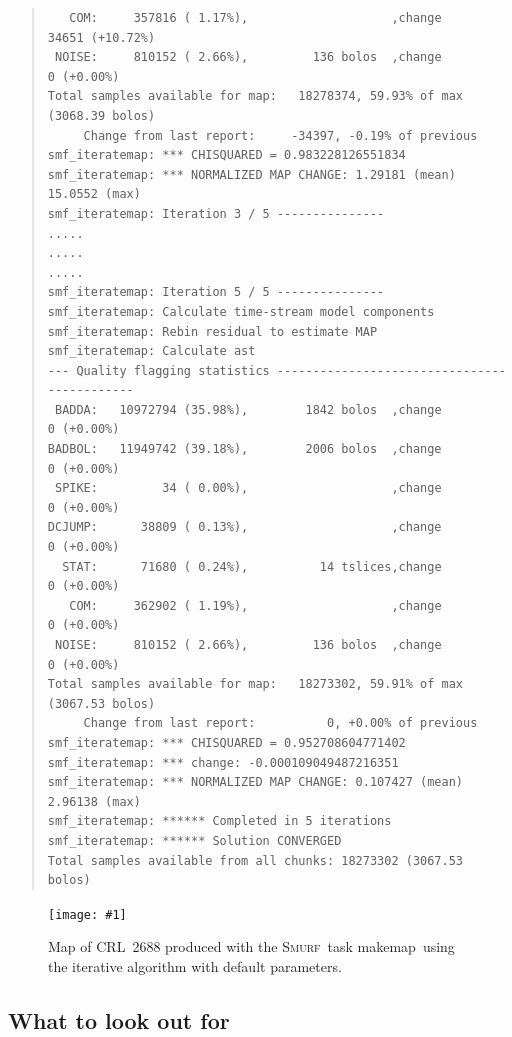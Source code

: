 \documentclass[twoside,11pt]{article}
\newcommand{\htmladdimg}[1]{}
\newcommand{\latex}[1]{#1}
\newcommand{\xref}[3]{#1}
\newcommand{\xlabel}[1]{}
\renewcommand{\_}{\texttt{\symbol{95}}}
\newenvironment{myquote}{
   \color{MidnightBlue}\begin{quote}\begin{small}}{
   \end{small}\end{quote}
}
\newcommand{\smurf}{\xref{\textsc{Smurf}}{sun258}{}}
\newcommand{\task}[1]{\textsf{#1}}
\newcommand{\makemap}{\xref{\task{makemap}}{sun258}{MAKEMAP}}
\newcommand{\myfig}[6]{
  \begin{figure}#2
    \centering\texttt{[image: \#1]}
    \typeout{#1 inserted on page \arabic{page}}
    \caption[#5]{\label{#4}\small #6}
  \end{figure}
}
\newcommand{\myfig}[6]{
    \label{#4} \htmladdimg{#1.png}\\
    \\
    Figure: #6\\
  }
\renewenvironment{myquote}{
      \begin{quote}\begin{small}}{
      \end{small}\end{quote}
   }
\begin{document}
\begin{myquote}
\begin{verbatim}
   COM:     357816 ( 1.17%),                    ,change      34651 (+10.72%)
 NOISE:     810152 ( 2.66%),         136 bolos  ,change          0 (+0.00%)
Total samples available for map:   18278374, 59.93% of max (3068.39 bolos)
     Change from last report:     -34397, -0.19% of previous
smf_iteratemap: *** CHISQUARED = 0.983228126551834
smf_iteratemap: *** NORMALIZED MAP CHANGE: 1.29181 (mean) 15.0552 (max)
smf_iteratemap: Iteration 3 / 5 ---------------
.....
.....
.....
smf_iteratemap: Iteration 5 / 5 ---------------
smf_iteratemap: Calculate time-stream model components
smf_iteratemap: Rebin residual to estimate MAP
smf_iteratemap: Calculate ast
--- Quality flagging statistics --------------------------------------------
 BADDA:   10972794 (35.98%),        1842 bolos  ,change          0 (+0.00%)
BADBOL:   11949742 (39.18%),        2006 bolos  ,change          0 (+0.00%)
 SPIKE:         34 ( 0.00%),                    ,change          0 (+0.00%)
DCJUMP:      38809 ( 0.13%),                    ,change          0 (+0.00%)
  STAT:      71680 ( 0.24%),          14 tslices,change          0 (+0.00%)
   COM:     362902 ( 1.19%),                    ,change          0 (+0.00%)
 NOISE:     810152 ( 2.66%),         136 bolos  ,change          0 (+0.00%)
Total samples available for map:   18273302, 59.91% of max (3067.53 bolos)
     Change from last report:          0, +0.00% of previous
smf_iteratemap: *** CHISQUARED = 0.952708604771402
smf_iteratemap: *** change: -0.000109049487216351
smf_iteratemap: *** NORMALIZED MAP CHANGE: 0.107427 (mean) 2.96138 (max)
smf_iteratemap: ****** Completed in 5 iterations
smf_iteratemap: ****** Solution CONVERGED
Total samples available from all chunks: 18273302 (3067.53 bolos)
\end{verbatim}
\end{myquote}
\begin{htmlonly}
\myfig{sc21_crl2688}{[t!]}{width=0.7\linewidth}{fig:itermap}{
  CRL~2688 produced with \makemap}{
  Map of CRL~2688 produced with the \smurf\ task \makemap\ using the
  iterative algorithm with default parameters.
}
\end{htmlonly}

\subsection{\xlabel{look_for}What to look out for}
\flushbottom
\end{document}
